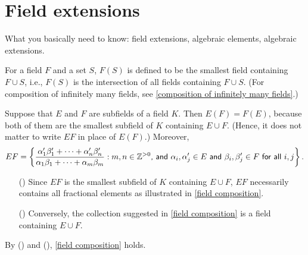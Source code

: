 \section{Field extensions}

What you basically need to know: field extensions, algebraic elements, algebraic extensions.

\begin{obs}\label{basic of field composition}
    For a field $F$ and a set $S$, $F(S)$ is defined to be the smallest field containing $F\cup S$, i.e., $F(S)$ is the intersection of all fields containing $F\cup S$.
    (For composition of infinitely many fields, see \cref{composition of infinitely many  fields}.)
    
    Suppose that $E$ and $F$ are subfields of a field $K$.
    Then $E(F)=F(E)$, because both of them are the smallest subfield of $K$ containing $E\cup F$.
    (Hence, it does not matter to write $EF$ in place of $E(F)$.)
    Moreover,
    \begin{align}\label{field composition}
        EF
        =\left\{
            \frac{\alpha_1'\beta_1'+\cdots+\alpha_n'\beta_n'}{\alpha_1\beta_1+\cdots+\alpha_m\beta_m}
            :
            \textsf{$m, n\in{\mathbb{Z}}^{>0}$, and $\alpha_i, \alpha_j'\in E$ and $\beta_i, \beta_j'\in F$ for all $i, j$}\right\}.
    \end{align}
    \begin{enumerate}
        \item[(\romannumeral 1)]
        {
            Since $EF$ is the smallest subfield of $K$ containing $E\cup F$, $EF$ necessarily contains all fractional elements as illustrated in \cref{field composition}.
        }
        \item[(\romannumeral 2)]
        {
            Conversely, the collection suggested in \cref{field composition} is a field containing $E\cup F$.
        }
    \end{enumerate}
    By () and (), \cref{field composition} holds.


\end{obs}
